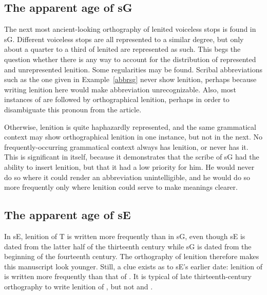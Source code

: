 \subsection{The apparent age of \gls{sG}}
\label{sec:apparent-age-glssg}

The next most ancient-looking orthography of lenited voiceless stops is found in \gls{sG}. Different voiceless stops are all represented to a similar degree, but only about a quarter to a third of lenited  are represented as such. This begs the question whether there is any way to account for the distribution of represented and unrepresented lenition. Some regularities may be found. Scribal abbreviations such as the one given in Example~\ref{abbrsg} never show lenition, perhaps because writing lenition here would make abbreviation unrecognizable.
Also, most instances of  are followed by orthographical lenition, perhaps in order to disambiguate this pronoun from the article.

Otherwise, lenition is quite haphazardly represented, and the same grammatical context may show orthographical lenition in one instance, but not in the next. No frequently-occurring grammatical context always has lenition, or never has it. This is significant in itself, because it demonstrates that the scribe of \gls{sG} had the ability to insert lenition, but that it had a low priority for him. He would never do so where it could render an abbreviation unintelligible, and he would do so more frequently only where lenition could serve to make meanings clearer.

\subsection{The apparent age of \gls{sE}}
\label{sec:apparent-age-glsse}

In \gls{sE}, lenition of \gls{T} is written more frequently than in \gls{sG}, even though \gls{sE} is dated from the latter half of the thirteenth century while \gls{sG} is dated from the beginning of the fourteenth century. The orthography of lenition therefore makes this manuscript look younger. Still, a clue exists as to \gls{sE}'s earlier date: lenition of  is written  more frequently than that of . It is typical of late thirteenth-century orthography to write lenition of , but not  and . 

